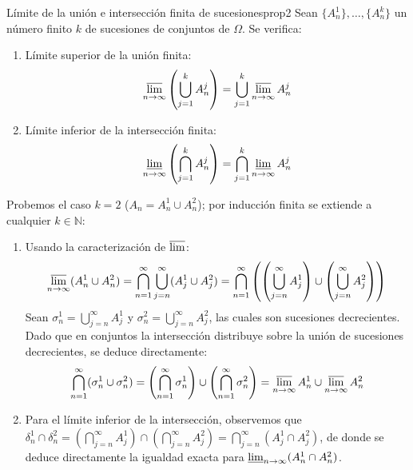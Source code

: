 \newpage

\begin{proposicion}{Límite de la unión e intersección finita de sucesiones}{prop2}
Sean $\{A_n^1\}, \dots, \{A_n^k\}$ un número finito $k$ de sucesiones de conjuntos de $\Omega$. Se verifica:
\begin{enumerate}[label=\alph*)]
    \item Límite superior de la unión finita:
    \[
        \varlimsup_{n \to \infty} \left( \bigcup_{j=1}^k A_n^j \right) = \bigcup_{j=1}^k \varlimsup_{n \to \infty} A_n^j
    \]
    \item Límite inferior de la intersección finita:
    \[
        \varliminf_{n \to \infty} \left( \bigcap_{j=1}^k A_n^j \right) = \bigcap_{j=1}^k \varliminf_{n \to \infty} A_n^j
    \]
\end{enumerate}
\end{proposicion}

\begin{demostracion}
Probemos el caso $k=2$ ($A_n = A_n^1 \cup A_n^2$); por inducción finita se extiende a cualquier $k \in \mathbb{N}$:
\begin{enumerate}[label=\alph*)]
    \item Usando la caracterización de $\varlimsup$:
    \[
        \varlimsup_{n \to \infty} (A_n^1 \cup A_n^2) = \bigcap_{n=1}^\infty \bigcup_{j=n}^\infty (A_j^1 \cup A_j^2) = \bigcap_{n=1}^\infty \left( \left( \bigcup_{j=n}^\infty A_j^1 \right) \cup \left( \bigcup_{j=n}^\infty A_j^2 \right) \right)
    \]
    Sean $\sigma_n^1 = \bigcup_{j=n}^\infty A_j^1$ y $\sigma_n^2 = \bigcup_{j=n}^\infty A_j^2$, las cuales son sucesiones decrecientes. Dado que en conjuntos la intersección distribuye sobre la unión de sucesiones decrecientes, se deduce directamente:
    \[
        \bigcap_{n=1}^\infty (\sigma_n^1 \cup \sigma_n^2) = \left(\bigcap_{n=1}^\infty \sigma_n^1\right) \cup \left(\bigcap_{n=1}^\infty \sigma_n^2\right) = \varlimsup_{n \to \infty} A_n^1 \cup \varlimsup_{n \to \infty} A_n^2
    \]

    \item Para el límite inferior de la intersección, observemos que $\delta_n^1 \cap \delta_n^2 = \left(\bigcap_{j=n}^\infty A_j^1\right) \cap \left(\bigcap_{j=n}^\infty A_j^2\right) = \bigcap_{j=n}^\infty (A_j^1 \cap A_j^2)$, de donde se deduce directamente la igualdad exacta para $\varliminf_{n \to \infty} (A_n^1 \cap A_n^2)$.
\end{enumerate}
\end{demostracion}

